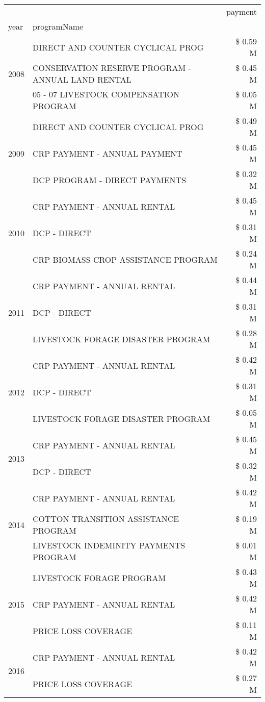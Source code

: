 \begin{tabular}{llr}
\toprule
 &  & payment \\
year & programName &  \\
\midrule
\multirow[t]{3}{*}{2008} & DIRECT AND COUNTER CYCLICAL PROG & \$ 0.59 M \\
 & CONSERVATION RESERVE PROGRAM - ANNUAL LAND RENTAL & \$ 0.45 M \\
 & 05 - 07 LIVESTOCK COMPENSATION PROGRAM & \$ 0.05 M \\
\cline{1-3}
\multirow[t]{3}{*}{2009} & DIRECT AND COUNTER CYCLICAL PROG & \$ 0.49 M \\
 & CRP PAYMENT - ANNUAL PAYMENT & \$ 0.45 M \\
 & DCP PROGRAM - DIRECT PAYMENTS & \$ 0.32 M \\
\cline{1-3}
\multirow[t]{3}{*}{2010} & CRP PAYMENT - ANNUAL RENTAL & \$ 0.45 M \\
 & DCP - DIRECT & \$ 0.31 M \\
 & CRP BIOMASS CROP ASSISTANCE PROGRAM & \$ 0.24 M \\
\cline{1-3}
\multirow[t]{3}{*}{2011} & CRP PAYMENT - ANNUAL RENTAL & \$ 0.44 M \\
 & DCP - DIRECT & \$ 0.31 M \\
 & LIVESTOCK FORAGE DISASTER PROGRAM & \$ 0.28 M \\
\cline{1-3}
\multirow[t]{3}{*}{2012} & CRP PAYMENT - ANNUAL RENTAL & \$ 0.42 M \\
 & DCP - DIRECT & \$ 0.31 M \\
 & LIVESTOCK FORAGE DISASTER PROGRAM & \$ 0.05 M \\
\cline{1-3}
\multirow[t]{2}{*}{2013} & CRP PAYMENT - ANNUAL RENTAL & \$ 0.45 M \\
 & DCP - DIRECT & \$ 0.32 M \\
\cline{1-3}
\multirow[t]{3}{*}{2014} & CRP PAYMENT - ANNUAL RENTAL & \$ 0.42 M \\
 & COTTON TRANSITION ASSISTANCE PROGRAM & \$ 0.19 M \\
 & LIVESTOCK INDEMINITY PAYMENTS PROGRAM & \$ 0.01 M \\
\cline{1-3}
\multirow[t]{3}{*}{2015} & LIVESTOCK FORAGE PROGRAM & \$ 0.43 M \\
 & CRP PAYMENT - ANNUAL RENTAL & \$ 0.42 M \\
 & PRICE LOSS COVERAGE & \$ 0.11 M \\
\cline{1-3}
\multirow[t]{3}{*}{2016} & CRP PAYMENT - ANNUAL RENTAL & \$ 0.42 M \\
 & PRICE LOSS COVERAGE & \$ 0.27 M \\

\end{tabular}
